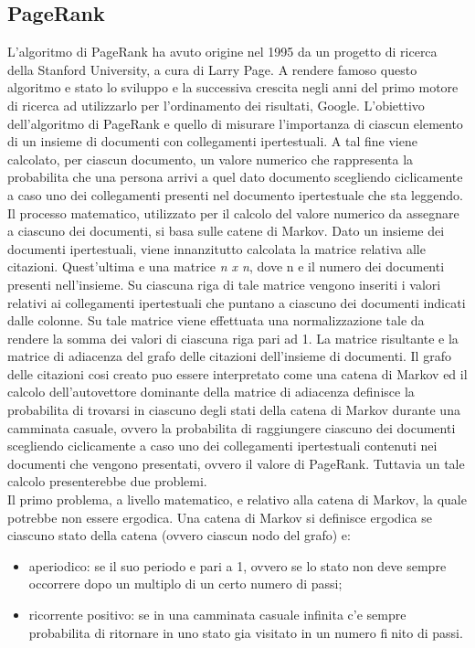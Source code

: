 \subsection{PageRank}
L'algoritmo di PageRank \cite{cit_45} ha avuto origine nel 1995 da un progetto di ricerca
della Stanford University, a cura di Larry Page. A rendere famoso questo
algoritmo e stato lo sviluppo e la successiva crescita negli anni del primo motore
di ricerca ad utilizzarlo per l'ordinamento dei risultati, Google. L'obiettivo
dell'algoritmo di PageRank e quello di misurare l'importanza di ciascun elemento
di un insieme di documenti con collegamenti ipertestuali. A tal fine
viene calcolato, per ciascun documento, un valore numerico che rappresenta la
probabilita che una persona arrivi a quel dato documento scegliendo ciclicamente
a caso uno dei collegamenti presenti nel documento ipertestuale che sta
leggendo. Il processo matematico, utilizzato per il calcolo del valore numerico
da assegnare a ciascuno dei documenti, si basa sulle catene di Markov. Dato
un insieme dei documenti ipertestuali, viene innanzitutto calcolata la matrice
relativa alle citazioni. Quest'ultima e una matrice \textit{n x n}, dove n e il numero
dei documenti presenti nell'insieme. Su ciascuna riga di tale matrice vengono
inseriti i valori relativi ai collegamenti ipertestuali che puntano a ciascuno dei
documenti indicati dalle colonne. Su tale matrice viene effettuata una normalizzazione
tale da rendere la somma dei valori di ciascuna riga pari ad 1. La
matrice risultante e la matrice di adiacenza del grafo delle citazioni dell'insieme
di documenti.
Il grafo delle citazioni cosi creato puo essere interpretato come una catena
di Markov ed il calcolo dell'autovettore dominante della matrice di adiacenza
definisce la probabilita di trovarsi in ciascuno degli stati della catena di Markov
durante una camminata casuale, ovvero la probabilita di raggiungere ciascuno
dei documenti scegliendo ciclicamente a caso uno dei collegamenti ipertestuali
contenuti nei documenti che vengono presentati, ovvero il valore di PageRank.
Tuttavia un tale calcolo presenterebbe due problemi.\\
Il primo problema, a livello matematico, e relativo alla catena di Markov, la
quale potrebbe non essere ergodica. Una catena di Markov si definisce ergodica
se ciascuno stato della catena (ovvero ciascun nodo del grafo) e:
\begin{itemize}
\item aperiodico: se il suo periodo e pari a 1, ovvero se lo stato non deve sempre
occorrere dopo un multiplo di un certo numero di passi;
\item ricorrente positivo: se in una camminata casuale infinita c'e sempre
probabilita di ritornare in uno stato gia visitato in un numero finito
di passi.
\end{itemize}
